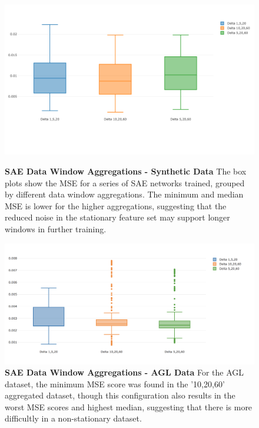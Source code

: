\documentclass[a4paper,latin]{paper}
\begin{document}
\begin{figure}[H]
	\centering
	\begin{minipage}{0.45\textwidth}
		\centering 
		\includegraphics[scale=0.3]{images/iteration_four/it4_sae_deltas.png}
		\caption{\textbf{SAE Data Window Aggregations - Synthetic Data} 
			\newline The box plots show the MSE for a series of SAE networks trained, grouped by different data window aggregations. The minimum and median MSE is lower for the higher aggregations, suggesting that the reduced noise in the stationary feature set may support longer windows in further training.}
		\label{figure-results_sae_deltas}
	\end{minipage}\hfill
	\begin{minipage}{0.45\textwidth}
		\centering \includegraphics[scale=0.3]{images/iteration_five/it5_delta_sae.png}
		\caption{\textbf{SAE Data Window Aggregations - AGL Data} 
			\newline For the AGL dataset, the minimum MSE score was found in the '10,20,60' aggregated dataset, though this configuration also results in the worst MSE scores and highest median, suggesting that there is more difficultly in a non-stationary dataset.}
		\label{figure-it5_delta_sae}
	\end{minipage}
\end{figure}
\end{document}
